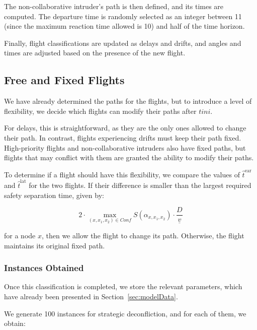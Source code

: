 \documentclass[../../thesis.tex]{subfiles}
\begin{document}
The non-collaborative intruder’s path is then defined, and its times are computed. The departure time is randomly selected as an integer between 11 (since the maximum reaction time allowed is 10) and half of the time horizon.  

Finally, flight classifications are updated as delays and drifts, and angles and times are adjusted based on the presence of the new flight.\newline

\subsection{Free and Fixed Flights}

We have already determined the paths for the flights, but to introduce a level of flexibility, we decide which flights can modify their paths after \( tini \).  

For delays, this is straightforward, as they are the only ones allowed to change their path. In contrast, flights experiencing drifts must keep their path fixed.  
High-priority flights and non-collaborative intruders also have fixed paths, but flights that may conflict with them are granted the ability to modify their paths.  

To determine if a flight should have this flexibility, we compare the values of \( \hat{t}^\text{ear} \) and \( \hat{t}^\text{lat} \) for the two flights. If their difference is smaller than the largest required safety separation time, given by:  

\[
2\cdot\max_{(x,x_1,x_2)\in Conf} S(\alpha_{x,x_1,x_2})\cdot \frac{D}{\underline v}
\]

for a node \( x \), then we allow the flight to change its path. Otherwise, the flight maintains its original fixed path.  

\subsubsection{Instances Obtained}

Once this classification is completed, we store the relevant parameters, which have already been presented in Section~\ref{sec:modelData}.

We generate 100 instances for strategic deconfliction, and for each of them, we obtain:  
\end{document}
